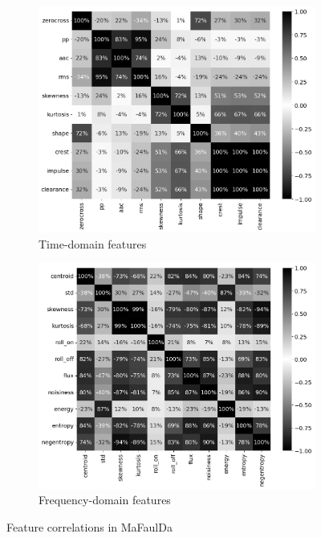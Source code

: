 \begin{figure}[h]
    \centering
    \begin{subfigure}[b]{0.48\textwidth}
        \includegraphics[width=\textwidth]{assets/results/feature-values/corr-A-3-TD.png}
        \caption{Time-domain features}
    \end{subfigure}
    \hfill
    \begin{subfigure}[b]{0.48\textwidth}
        \includegraphics[width=\textwidth]{assets/results/feature-values/corr-A-3-FD.png}
        \caption{Frequency-domain features}
    \end{subfigure}
    \caption{Feature correlations in MaFaulDa}
\end{figure}


